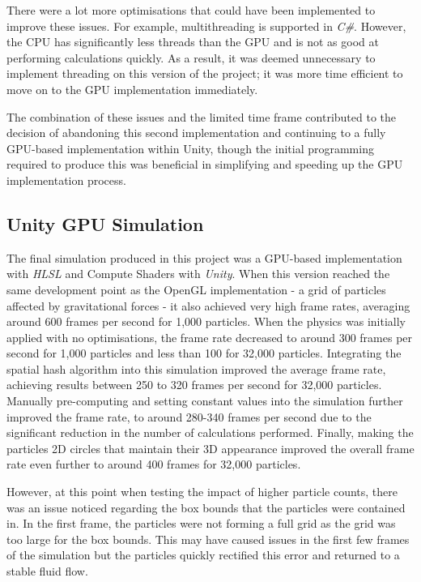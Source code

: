 \documentclass[a4paper, 12pt]{article}
\begin{document}
    There were a lot more optimisations that could have been implemented to improve these issues. For example, multithreading is supported in \textit{C\#}. However, the CPU has significantly less threads than the GPU and is not as good at performing calculations quickly. As a result, it was deemed unnecessary to implement threading on this version of the project; it was more time efficient to move on to the GPU implementation immediately.

    The combination of these issues and the limited time frame contributed to the decision of abandoning this second implementation and continuing to a fully GPU-based implementation within Unity, though the initial programming required to produce this was beneficial in simplifying and speeding up the GPU implementation process.


    \subsection{Unity GPU Simulation}
    
    The final simulation produced in this project was a GPU-based implementation with \textit{HLSL} and Compute Shaders with \textit{Unity}. When this version reached the same development point as the OpenGL implementation - a grid of particles affected by gravitational forces - it also achieved very high frame rates, averaging around 600 frames per second for 1,000 particles. When the physics was initially applied with no optimisations, the frame rate decreased to around 300 frames per second for 1,000 particles and less than 100 for 32,000 particles. Integrating the spatial hash algorithm into this simulation improved the average frame rate, achieving results between 250 to 320 frames per second for 32,000 particles. Manually pre-computing and setting constant values into the simulation further improved the frame rate, to around 280-340 frames per second due to the significant reduction in the number of calculations performed. Finally, making the particles 2D circles that maintain their 3D appearance improved the overall frame rate even further to around 400 frames for 32,000 particles.
    
    However, at this point when testing the impact of higher particle counts, there was an issue noticed regarding the box bounds that the particles were contained in. In the first frame, the particles were not forming a full grid as the grid was too large for the box bounds. This may have caused issues in the first few frames of the simulation but the particles quickly rectified this error and returned to a stable fluid flow.
\end{document}
